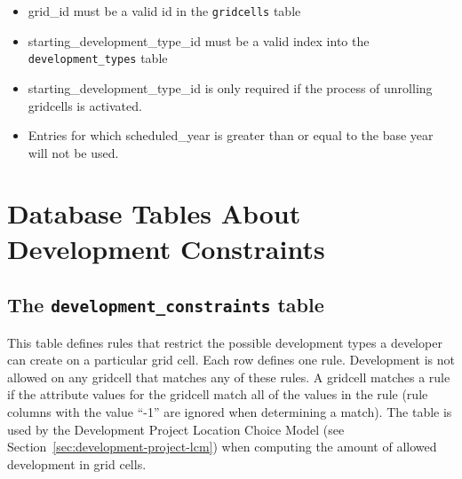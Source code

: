 \begin{itemize} \tight
\item grid_id must be a valid id in the \verb|gridcells| table
\item starting_development_type_id must be a valid index into the \verb|development_types| table
\item starting_development_type_id is only required if the process of unrolling gridcells is activated.
\item Entries for which scheduled_year is greater than or equal to the base year will not be used.
\end{itemize}

\section{Database Tables About Development Constraints}
%
\subsection{The {\tt development_constraints} table}

This table defines rules that restrict the possible development types a
developer can create on a particular grid cell.  Each row defines one rule.
Development is not allowed on any gridcell that matches any of these rules.  A
gridcell matches a rule if the attribute values for the gridcell match all of
the values in the rule (rule columns with the value ``-1'' are ignored when
determining a match). The table is used by the Development Project Location Choice Model 
(see Section~\ref{sec:development-project-lcm}) when computing the amount of allowed development 
in grid cells.

